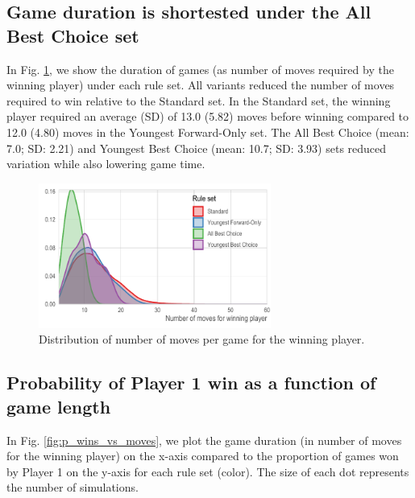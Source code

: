 \documentclass[letterpaper,9pt,twocolumn,twoside,]{pinp}
\begin{document}
\hypertarget{game-duration-is-shortested-under-the-all-best-choice-set}{%
\subsection{Game duration is shortested under the All Best Choice
set}\label{game-duration-is-shortested-under-the-all-best-choice-set}}

In Fig. \ref{fig:p_winning_dist}, we show the duration of games (as
number of moves required by the winning player) under each rule set. All
variants reduced the number of moves required to win relative to the
Standard set. In the Standard set, the winning player required an
average (SD) of 13.0 (5.82) moves before winning compared to 12.0 (4.80)
moves in the Youngest Forward-Only set. The All Best Choice (mean: 7.0;
SD: 2.21) and Youngest Best Choice (mean: 10.7; SD: 3.93) sets reduced
variation while also lowering game time.

\begin{figure}
  \begin{center}
    \includegraphics[width=3in]{./../../plots/p_winning_dist.pdf}
    \caption{Distribution of number of moves per game for the winning player.}
    \label{fig:p_winning_dist}
  \end{center}
\end{figure}

\hypertarget{probability-of-player-1-win-as-a-function-of-game-length}{%
\subsection{Probability of Player 1 win as a function of game
length}\label{probability-of-player-1-win-as-a-function-of-game-length}}

In Fig. \ref{fig:p_wins_vs_moves}, we plot the game duration (in number
of moves for the winning player) on the x-axis compared to the
proportion of games won by Player 1 on the y-axis for each rule set
(color). The size of each dot represents the number of simulations.
\end{document}
